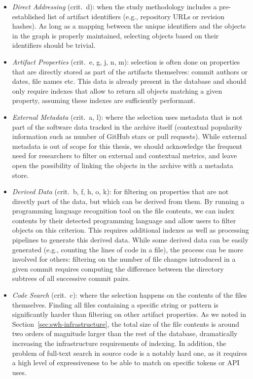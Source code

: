 \begin{itemize}
    \setlength\itemsep{0em}
\item \emph{Direct Addressing} (crit.\ d): when the study methodology includes
    a pre-established list of artifact identifiers (e.g., repository URLs or
    revision hashes). As long as a mapping between the unique identifiers and
    the objects in the graph is properly maintained, selecting objects based on
    their identifiers should be trivial.

\item \emph{Artifact Properties} (crit.\ e, g, j, n, m): selection is
    often done on properties that are directly stored as part of the artifacts
    themselves: commit authors or dates, file names etc. This data is
    already present in the database and should only require indexes that allow
    to return all objects matching a given property, assuming these indexes
    are sufficiently performant.

\item \emph{External Metadata} (crit.\ a, l): where the selection uses
    metadata that is not part of the software data tracked in the archive
    itself (contextual popularity information such as number of GitHub stars or
    pull requests). While external metadata is out of scope for this thesis, we
    should acknowledge the frequent need for researchers to filter on
    external and contextual metrics, and leave open the possibility of linking
    the objects in the archive with a metadata store.

\item \emph{Derived Data} (crit.\ b, f, h, o, k): for filtering on properties
    that are not directly part of the data, but which can be derived from them.
    By running a programming language recognition tool on the file contents, we
    can index contents by their detected programming language and allow users
    to filter objects on this criterion. This requires additional indexes as
    well as processing pipelines to generate this derived data.  While some
    derived data can be easily generated (e.g., counting the lines of code in
    a file), the process can be more involved for others: filtering on the
    number of file changes introduced in a given commit requires computing the
    difference between the directory subtrees of all successive commit pairs.

\item \emph{Code Search} (crit.\ c): where the selection happens on the contents
    of the files themselves. Finding all files containing a specific string or
    pattern is significantly harder than filtering on other artifact
    properties. As we noted in Section~\ref{sec:swh-infrastructure}, the total
    size of the file contents is around two orders of magnitude larger than the
    rest of the database, dramatically increasing the infrastructure
    requirements of indexing. In addition, the problem of full-text search
    in source code is a notably hard one, as it requires a high level of
    expressiveness to be able to match on specific tokens or API uses.
    \end{itemize}


